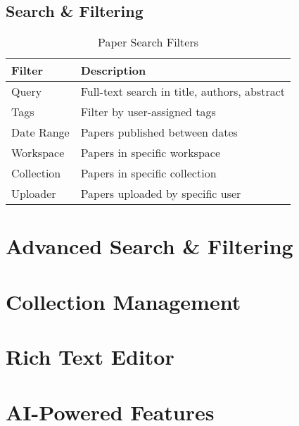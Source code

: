 \subsection{Search \& Filtering}

\begin{table}[H]
\centering
\caption{Paper Search Filters}
\label{tab:paper-filters}
\begin{tabular}{@{}lp{8cm}@{}}
\toprule
\textbf{Filter} & \textbf{Description} \\
\midrule
Query & Full-text search in title, authors, abstract \\
Tags & Filter by user-assigned tags \\
Date Range & Papers published between dates \\
Workspace & Papers in specific workspace \\
Collection & Papers in specific collection \\
Uploader & Papers uploaded by specific user \\
\bottomrule
\end{tabular}
\end{table}


\section{Advanced Search \& Filtering}
\label{sec:feature-search}


\section{Collection Management}
\label{sec:feature-collections}


\section{Rich Text Editor}
\label{sec:feature-editor}


\section{AI-Powered Features}
\label{sec:feature-ai}

